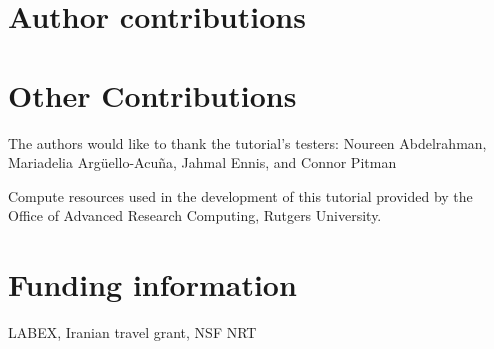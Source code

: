 \documentclass[9pt,tutorial]{Styling/livecoms}
\begin{document}





\section{Author contributions}

\section{Other Contributions}
The authors would like to thank the tutorial's testers: 
Noureen Abdelrahman, 
Mariadelia Arg\"uello-Acu\~na,
Jahmal Ennis, 
and
Connor Pitman

Compute resources used in the development of this tutorial provided by the Office of Advanced Research Computing, Rutgers University.




\makeorcid

\section{Funding information}

LABEX, Iranian travel grant, NSF NRT




% 

\end{document}
